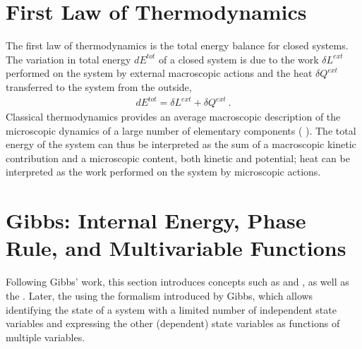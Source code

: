 \documentclass[letterpaper,10pt,english]{jupyterBook}
\begin{document}
\sphinxstepscope


\section{First Law of Thermodynamics}
\label{\detokenize{ch/principles-first:first-law-of-thermodynamics}}\label{\detokenize{ch/principles-first:physics-hs-thermodynamics-foundation-principles-first}}\label{\detokenize{ch/principles-first::doc}}
\sphinxAtStartPar
The first law of thermodynamics is the total energy balance for closed systems. The variation in total energy \(d E^{tot}\) of a closed system is due to the work \(\delta L^{ext}\) performed on the system by external macroscopic actions and the heat \(\delta Q^{ext}\) transferred to the system from the outside,
\begin{equation*}
\begin{split}d E^{tot} = \delta L^{ext} + \delta Q^{ext} \ .\end{split}
\end{equation*}
\sphinxAtStartPar
Classical thermodynamics provides an average macroscopic description of the microscopic dynamics of a large number of elementary components ( ). The total energy of the system can thus be interpreted as the sum of a macroscopic kinetic contribution and a microscopic content, both kinetic and potential; heat can be interpreted as the work performed on the system by microscopic actions.



\sphinxstepscope


\section{Gibbs: Internal Energy, Phase Rule, and Multivariable Functions}
\label{\detokenize{ch/principles-gibbs-phase-rule:gibbs-internal-energy-phase-rule-and-multivariable-functions}}\label{\detokenize{ch/principles-gibbs-phase-rule:physics-hs-thermodynamics-foundation-principles-gibbs-phase-rule}}\label{\detokenize{ch/principles-gibbs-phase-rule::doc}}
\sphinxAtStartPar
Following Gibbs’ work, this section introduces concepts such as {\hyperref[\detokenize{ch/principles-gibbs-phase-rule:physics-hs-thermodynamics-foundation-principles-gibbs-phase-rule-state-vars}]{}} and {\hyperref[\detokenize{ch/principles-gibbs-phase-rule:physics-hs-thermodynamics-foundation-principles-gibbs-phase-rule-internal-energy}]{}}, as well as the {\hyperref[\detokenize{ch/principles-gibbs-phase-rule:physics-hs-thermodynamics-foundation-principles-gibbs-phase-rule-gibbs-phase-rule}]{}}. Later, the  using the formalism introduced by Gibbs, which allows identifying the state of a system with a limited number of independent state variables and expressing the other (dependent) state variables as functions of multiple variables.
\end{document}
